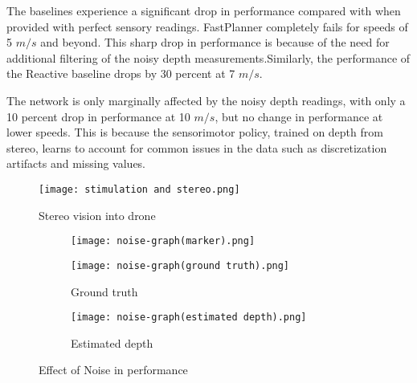 The baselines experience a significant drop in performance compared with when provided with perfect sensory readings. FastPlanner \cite{fastPlanner} completely fails for speeds of 5 $m/s$ and beyond. This sharp drop in performance is because of the need for additional filtering of the noisy depth measurements.Similarly, the performance of the Reactive baseline drops by 30 percent at 7 $m/s$.

The network is only marginally affected by the noisy depth readings, with only a 10 percent drop in performance at 10 $m/s$, but no change in performance at lower speeds. This is because the sensorimotor policy, trained on depth from stereo, learns to account for common issues in the data such as discretization
artifacts and missing values. 

\begin{figure}[!h]
	\centering
	\texttt{[image: stimulation and stereo.png]}
	\caption{Stereo vision into drone}
	\label{fig:sterio-vision}
\end{figure}

\begin{figure}[!h]
	\centering
	\begin{subfigure}[b]{0.75\textwidth}
		\texttt{[image: noise-graph(marker).png]}
	\end{subfigure}
	\begin{subfigure}[b]{0.48\textwidth}
		\texttt{[image: noise-graph(ground truth).png]}
		\caption{Ground truth}
	\end{subfigure}
	\begin{subfigure}[b]{0.48\textwidth}
		\texttt{[image: noise-graph(estimated depth).png]}
		\caption{Estimated depth}
	\end{subfigure}
	\caption{Effect of Noise in performance}
	\label{fig:noise-graph}
\end{figure}